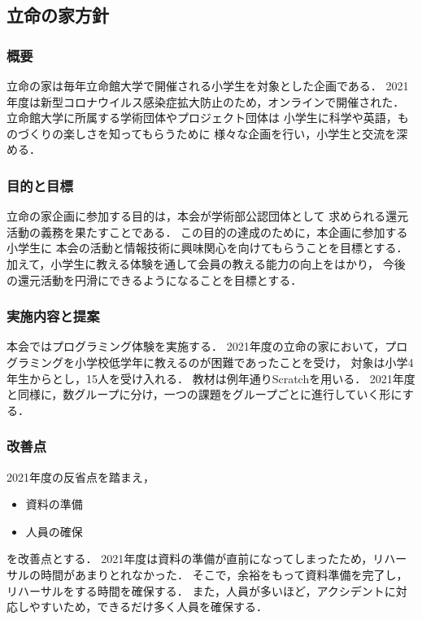 \subsection*{立命の家方針}


\subsubsection*{概要}
立命の家は毎年立命館大学で開催される小学生を対象とした企画である．
2021年度は新型コロナウイルス感染症拡大防止のため，オンラインで開催された．
立命館大学に所属する学術団体やプロジェクト団体は
小学生に科学や英語，ものづくりの楽しさを知ってもらうために
様々な企画を行い，小学生と交流を深める．

\subsubsection*{目的と目標}
立命の家企画に参加する目的は，本会が学術部公認団体として
求められる還元活動の義務を果たすことである．
この目的の達成のために，本企画に参加する小学生に
本会の活動と情報技術に興味関心を向けてもらうことを目標とする．
加えて，小学生に教える体験を通して会員の教える能力の向上をはかり，
今後の還元活動を円滑にできるようになることを目標とする．

\subsubsection*{実施内容と提案}
本会ではプログラミング体験を実施する．
2021年度の立命の家において，プログラミングを小学校低学年に教えるのが困難であったことを受け，
対象は小学4年生からとし，15人を受け入れる．
教材は例年通りScratchを用いる．
2021年度と同様に，数グループに分け，一つの課題をグループごとに進行していく形にする．

\subsubsection*{改善点}
2021年度の反省点を踏まえ，
\begin{itemize}
  \item 資料の準備
  \item 人員の確保
\end{itemize}
を改善点とする．
2021年度は資料の準備が直前になってしまったため，リハーサルの時間があまりとれなかった．
そこで，余裕をもって資料準備を完了し，リハーサルをする時間を確保する．
また，人員が多いほど，アクシデントに対応しやすいため，できるだけ多く人員を確保する．

